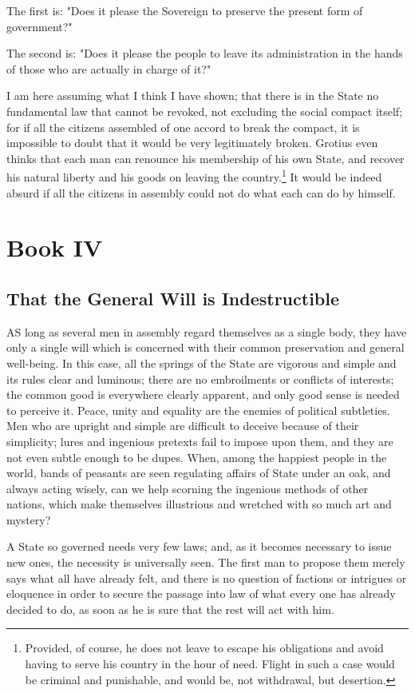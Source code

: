 \documentclass[12pt]{book}
\newcommand{\mychapter}[2]{
\setcounter{chapter}{#1}
    \setcounter{section}{0}
    \chapter*{#2}
    \addcontentsline{toc}{chapter}{#2}
}
\begin{document}
The first is: "Does it please the Sovereign to preserve the present form of government?"

The second is: "Does it please the people to leave its administration in the hands of those who are actually in charge of it?"

I am here assuming what I think I have shown; that there is in the State no fundamental law that cannot be revoked, not excluding the social compact itself; for if all the citizens assembled of one accord to break the compact, it is impossible to doubt that it would be very legitimately broken. Grotius even thinks that each man can renounce his membership of his own State, and recover his natural liberty and his goods on leaving the country.\footnote{Provided, of course, he does not leave to escape his obligations and avoid having to serve his country in the hour of need. Flight in such a case would be criminal and punishable, and would be, not withdrawal, but desertion.} It would be indeed absurd if all the citizens in assembly could not do what each can do by himself.
\mychapter{4}{Book IV}
\section{That the General Will is Indestructible}
AS long as several men in assembly regard themselves as a single body, they have only a single will which is concerned with their common preservation and general well-being. In this case, all the springs of the State are vigorous and simple and its rules clear and luminous; there are no embroilments or conflicts of interests; the common good is everywhere clearly apparent, and only good sense is needed to perceive it. Peace, unity and equality are the enemies of political subtleties. Men who are upright and simple are difficult to deceive because of their simplicity; lures and ingenious pretexts fail to impose upon them, and they are not even subtle enough to be dupes. When, among the happiest people in the world, bands of peasants are seen regulating affairs of State under an oak, and always acting wisely, can we help scorning the ingenious methods of other nations, which make themselves illustrious and wretched with so much art and mystery?

A State so governed needs very few laws; and, as it becomes necessary to issue new ones, the necessity is universally seen. The first man to propose them merely says what all have already felt, and there is no question of factions or intrigues or eloquence in order to secure the passage into law of what every one has already decided to do, as soon as he is sure that the rest will act with him.
\end{document}
